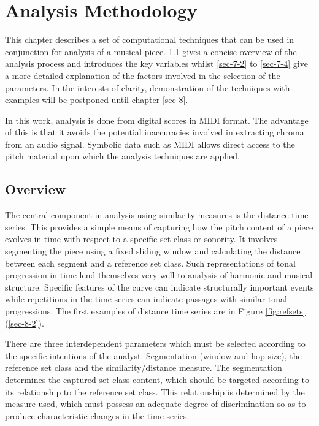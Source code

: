 \documentclass{article}
\begin{document}
\section{Analysis Methodology}
\label{sec-7}

This chapter describes a set of computational techniques that can be used in conjunction
for analysis of a musical piece. \ref{sec-7-1} gives a concise overview of
the analysis process and introduces the key variables whilst \ref{sec-7-2} to \ref{sec-7-4} give a more detailed
explanation of the factors involved in the selection of the
parameters. In the interests of clarity, demonstration of the
techniques with examples will be postponed until chapter \ref{sec-8}.

In this work, analysis is done from digital scores in MIDI format. The
advantage of this is that it avoids the potential inaccuracies
involved in extracting chroma from an audio signal. Symbolic data such
as MIDI allows direct access to the pitch material upon which the
analysis techniques are applied.
\subsection{Overview}
\label{sec-7-1}

The central component in analysis using similarity measures is the
distance time series. This provides a simple means of capturing how
the pitch content of a piece evolves in time with respect to a
specific set class or sonority. It involves segmenting the piece using
a fixed sliding window and calculating the distance between each
segment and a reference set class. Such representations of tonal
progression in time lend themselves very well to analysis of harmonic
and musical structure. Specific features of the curve can indicate
structurally important events while repetitions in the time series can
indicate passages with similar tonal progressions. The first examples
of distance time series are in Figure \ref{fig:refsets} (\ref{sec-8-2}).

There are three interdependent parameters which must be selected
according to the specific intentions of the analyst: Segmentation
(window and hop size), the reference set class and the
similarity/distance measure. The segmentation determines the captured
set class content, which should be targeted according to its
relationship to the reference set class. This relationship is
determined by the measure used, which must possess an adequate degree
of discrimination so as to produce characteristic changes in the time
series.
\end{document}
